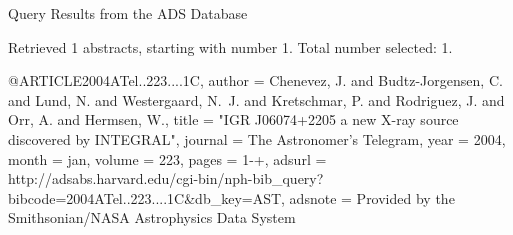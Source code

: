 Query Results from the ADS Database


Retrieved 1 abstracts, starting with number 1.  Total number selected: 1.

@ARTICLE{2004ATel..223....1C,
   author = {{Chenevez}, J. and {Budtz-Jorgensen}, C. and {Lund}, N. and 
	{Westergaard}, N.~J. and {Kretschmar}, P. and {Rodriguez}, J. and 
	{Orr}, A. and {Hermsen}, W.},
    title = "{IGR J06074+2205 a new X-ray source discovered by INTEGRAL}",
  journal = {The Astronomer's Telegram},
     year = 2004,
    month = jan,
   volume = 223,
    pages = {1-+},
   adsurl = {http://adsabs.harvard.edu/cgi-bin/nph-bib_query?bibcode=2004ATel..223....1C&db_key=AST},
  adsnote = {Provided by the Smithsonian/NASA Astrophysics Data System}
}


